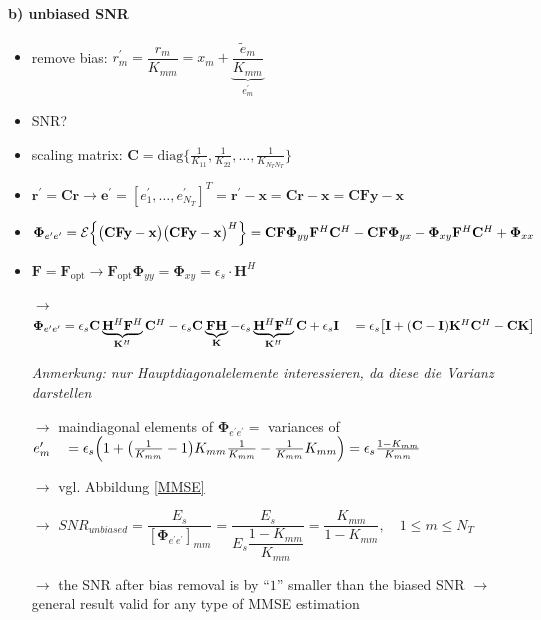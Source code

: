 \documentclass[a4paper, 10pt]{article}
\begin{document}
\paragraph{b) unbiased SNR}
\label{unbiased_SNR}
\begin{itemize}
	\item remove bias: $r_m^\prime = \dfrac{r_m}{K_{mm}} = x_m + \underbrace{\dfrac{\tilde{e}_m}{K_{mm}}}_{e^\prime_m} $
	\item SNR?
	\item scaling matrix: $ \mathbf{C} = \text{diag}\bigl\{\frac{1}{K_{11}}, \frac{1}{K_{22}}, \dots, \frac{1}{K_{N_TN_T}}  \bigr\} $
	\item $\mathbf{r}^\prime = \mathbf{Cr} \rightarrow \mathbf{e}^\prime = [e^\prime_1, \dots, e^\prime_{N_T}]^T = \mathbf{r}^\prime - \mathbf{x}  = \mathbf{Cr} - \mathbf{x} = \mathbf{CFy} - \mathbf{x} $
	\item $\boldsymbol{\Phi}_{e^\prime e^\prime} = \mathcal{E}\Bigl\{\bigr(\mathbf{CFy} - \mathbf{x}\bigr)\bigl(\mathbf{CFy} - \mathbf{x}\bigr)^H\Bigr\} = \mathbf{CF}\boldsymbol{\Phi}_{yy}\mathbf{F}^H\mathbf{C}^H - \mathbf{CF}\boldsymbol{\Phi}_{yx} - \boldsymbol{\Phi}_{xy}\mathbf{F}^H\mathbf{C}^H + \boldsymbol{\Phi}_{xx}$
	\item $ \mathbf{F} = 	\mathbf{F}_{\text{opt}} \rightarrow \mathbf{F}_{\text{opt}}\boldsymbol{\Phi}_{yy} = \boldsymbol{\Phi}_{xy} = \epsilon_s\cdot\mathbf{H}^H $
	\item[$\rightarrow$] $\boldsymbol{\Phi}_{e^\prime e^\prime} = \epsilon_s\mathbf{C}\underbrace{\mathbf{H}^H\mathbf{F}^H}_{\mathbf{K}^H}\mathbf{C}^H - \epsilon_s\mathbf{C}\underbrace{\mathbf{FH}}_{\mathbf{K}} - \epsilon_s\underbrace{\mathbf{H}^H\mathbf{F}^H}_{\mathbf{K}^H}\mathbf{C}  + \epsilon_s\mathbf{I} \\ \quad = \epsilon_s\bigl[\mathbf{I} + (\mathbf{C} - \mathbf{I})\mathbf{K}^H\mathbf{C}^H - \mathbf{CK}\bigr]$  
	\item[] \textit{Anmerkung: nur Hauptdiagonalelemente interessieren, da diese die Varianz darstellen}
	\item[$\rightarrow$] maindiagonal elements of $\boldsymbol{\Phi}_{e^\prime e^\prime} =  $ variances of $ e^\prime _m \quad = \epsilon_s\Bigl ( 1 + \bigl (\frac{1}{K_{mm}} - 1\bigr )   K_{mm}\frac{1}{K_{mm}}  - \frac{1}{K_{mm}}  K_{mm}\Bigr )  = \epsilon_s\frac{1 - K_{mm}}{K_{mm}}$
	\item[$\rightarrow$] vgl. Abbildung \ref{MMSE}
	\item[$\rightarrow$]$SNR_{unbiased}=\dfrac{E_s}{[\boldsymbol{\Phi}_{e^\prime e^\prime}]_{mm}}=\dfrac{E_s}{E_s\dfrac{1-K_{mm}}{K_{mm}}}
	=\dfrac{K_{mm}}{1-K_{mm}}, \quad 1\leq m \leq N_T$
	\item[$\rightarrow$]the SNR after bias removal is by ``$1$'' smaller than the biased SNR $\rightarrow$ general result valid for any type of
	MMSE estimation
\end{itemize}
\end{document}
